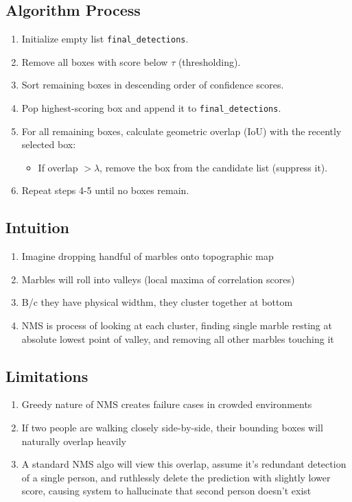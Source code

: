 \documentclass[12pt]{article}
\begin{document}
\subsection{Algorithm Process}
\begin{enumerate}
    \item Initialize empty list \texttt{final\_detections}.
    \item Remove all boxes with score below $\tau$ (thresholding).
    \item Sort remaining boxes in descending order of confidence scores.
    \item Pop highest-scoring box and append it to \texttt{final\_detections}.
    \item For all remaining boxes, calculate geometric overlap (IoU) with the recently selected box:
          \begin{itemize}
              \item If overlap $> \lambda$, remove the box from the candidate list (suppress it).
          \end{itemize}
    \item Repeat steps 4-5 until no boxes remain.
\end{enumerate}

\subsection{Intuition}
\begin{enumerate}
    \item Imagine dropping handful of marbles onto topographic map
    \item Marbles will roll into valleys (local maxima of correlation scores)
    \item B/c they have physical widthm, they cluster together at bottom
    \item NMS is process of looking at each cluster, finding single marble resting at absolute lowest point of valley, and removing all other marbles touching it
\end{enumerate}

\subsection{Limitations}
\begin{enumerate}
    \item Greedy nature of NMS creates failure cases in crowded environments
    \item If two people are walking closely side-by-side, their bounding boxes will naturally overlap heavily
    \item A standard NMS algo will view this overlap, assume it's redundant detection of a single person, and ruthlessly delete the prediction with slightly lower score, causing system to hallucinate that second person doesn't exist
\end{enumerate}
\end{document}
